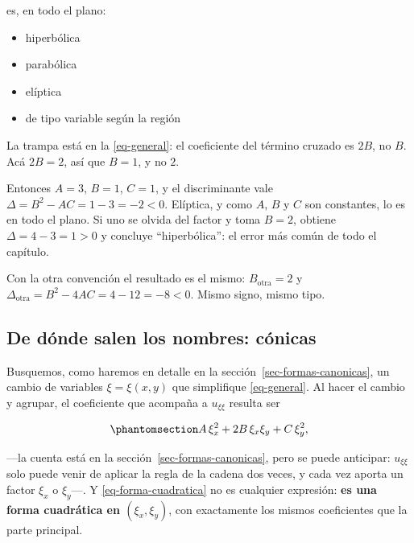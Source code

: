 \documentclass[
  spanish,
  a4paper,
]{scrbook}
\providecommand{\tightlist}{%
  \setlength{\itemsep}{0pt}\setlength{\parskip}{0pt}}
\theoremstyle{definition}
\theoremstyle{plain}
\theoremstyle{definition}
\theoremstyle{plain}
\theoremstyle{definition}
\theoremstyle{remark}
\begin{document}
es, en todo el plano:

\begin{itemize}
\tightlist
\item
  {hiperbólica}
\item
  {parabólica}
\item
  {elíptica}
\item
  {de tipo variable según la región}
\end{itemize}

La trampa está en la \ref{eq-general}: el coeficiente del término
cruzado es \(2B\), no \(B\). Acá \(2B = 2\), así que \(B = 1\), y no
\(2\).

Entonces \(A = 3\), \(B = 1\), \(C = 1\), y el discriminante vale
\(\Delta = B^2 - AC = 1 - 3 = -2 < 0\). Elíptica, y como \(A\), \(B\) y
\(C\) son constantes, lo es en todo el plano. Si uno se olvida del
factor y toma \(B = 2\), obtiene \(\Delta = 4 - 3 = 1 > 0\) y concluye
``hiperbólica'': el error más común de todo el capítulo.

Con la otra convención el resultado es el mismo: \(B_{\text{otra}} = 2\)
y \(\Delta_{\text{otra}} = B^2 - 4AC = 4 - 12 = -8 < 0\). Mismo signo,
mismo tipo.

\subsection{De dónde salen los nombres: cónicas}\label{sec-conicas}

Busquemos, como haremos en detalle en la
sección~\ref{sec-formas-canonicas}, un cambio de variables
\(\xi = \xi(x,y)\) que simplifique \ref{eq-general}. Al hacer el cambio
y agrupar, el coeficiente que acompaña a \(u_{\xi\xi}\) resulta ser

\begin{equation}\protect\phantomsection\label{eq-forma-cuadratica}{
A\,\xi_x^2 + 2B\,\xi_x\xi_y + C\,\xi_y^2 ,
}\end{equation}

---la cuenta está en la sección~\ref{sec-formas-canonicas}, pero se
puede anticipar: \(u_{\xi\xi}\) solo puede venir de aplicar la regla de
la cadena dos veces, y cada vez aporta un factor \(\xi_x\) o
\(\xi_y\)---. Y \ref{eq-forma-cuadratica} no es cualquier expresión:
\textbf{es una forma cuadrática en \((\xi_x, \xi_y)\)}, con exactamente
los mismos coeficientes que la parte principal.
\end{document}

